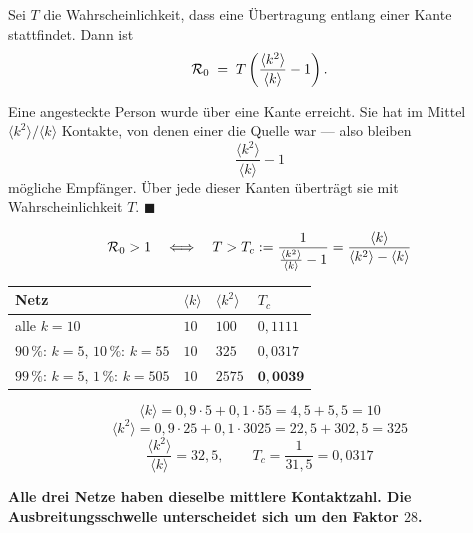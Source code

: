 \begin{merksatz}
Sei $T$ die Wahrscheinlichkeit, dass eine Übertragung entlang einer Kante stattfindet. Dann ist
\[ \mathcal{R}_0 \;=\; T\left(\frac{\langle k^2\rangle}{\langle k\rangle} - 1\right) . \]

Eine angesteckte Person wurde über eine Kante erreicht. Sie hat im Mittel $\langle k^2\rangle/\langle k\rangle$ Kontakte, von denen einer die Quelle war --- also bleiben
\[ \frac{\langle k^2\rangle}{\langle k\rangle} - 1 \]
mögliche Empfänger. Über jede dieser Kanten überträgt sie mit Wahrscheinlichkeit $T$. $\blacksquare$

\[ \mathcal{R}_0 > 1 \quad\Longleftrightarrow\quad T > T_c := \frac{1}{\frac{\langle k^2\rangle}{\langle k\rangle} - 1} = \frac{\langle k\rangle}{\langle k^2\rangle - \langle k\rangle} \]
\end{merksatz}

\begin{merksatz}
\begin{center}
{\small
\renewcommand{\arraystretch}{1.5}
\begin{tabular}{@{}P{3.0cm}P{1.4cm}P{1.6cm}P{2.0cm}@{}}
\toprule
\textbf{Netz} & $\langle k\rangle$ & $\langle k^2\rangle$ & $T_c$\\
\midrule
alle $k=10$ & $10$ & $100$ & $0{,}1111$\\
$90\,\%$: $k=5$, $10\,\%$: $k=55$ & $10$ & $325$ & $0{,}0317$\\
$99\,\%$: $k=5$, $1\,\%$: $k=505$ & $10$ & $2575$ & $\mathbf{0{,}0039}$\\
\bottomrule
\end{tabular}}
\end{center}

\[ \langle k\rangle = 0{,}9\cdot5 + 0{,}1\cdot55 = 4{,}5+5{,}5 = 10 \]
\[ \langle k^2\rangle = 0{,}9\cdot25 + 0{,}1\cdot3025 = 22{,}5+302{,}5 = 325 \]
\[ \frac{\langle k^2\rangle}{\langle k\rangle} = 32{,}5, \qquad T_c = \frac{1}{31{,}5} = 0{,}0317 \]

\begin{center}
\begin{minipage}{0.9\textwidth}
\textbf{Alle drei Netze haben dieselbe mittlere Kontaktzahl. Die Ausbreitungsschwelle unterscheidet sich um den Faktor $28$.}
\end{minipage}
\end{center}

\begin{center}
\begin{minipage}{0.88\textwidth}
\end{minipage}
\end{center}
\end{merksatz}

